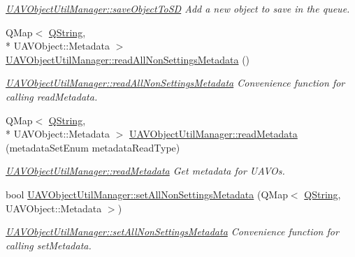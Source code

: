 \begin{DoxyCompactItemize}
\begin{DoxyCompactList}\small\item\em \hyperlink{group___u_a_v_object_util_plugin_ga007cecfcbf4a9d18c1f2c9ec13de4222}{U\-A\-V\-Object\-Util\-Manager\-::save\-Object\-To\-S\-D} Add a new object to save in the queue. \end{DoxyCompactList}\item 
Q\-Map$<$ \hyperlink{group___u_a_v_objects_plugin_gab9d252f49c333c94a72f97ce3105a32d}{Q\-String}, \\*
U\-A\-V\-Object\-::\-Metadata $>$ \hyperlink{group___u_a_v_object_util_plugin_ga1bc82b9cb256ba0c3974bab7489aba4a}{U\-A\-V\-Object\-Util\-Manager\-::read\-All\-Non\-Settings\-Metadata} ()
\begin{DoxyCompactList}\small\item\em \hyperlink{group___u_a_v_object_util_plugin_ga1bc82b9cb256ba0c3974bab7489aba4a}{U\-A\-V\-Object\-Util\-Manager\-::read\-All\-Non\-Settings\-Metadata} Convenience function for calling read\-Metadata. \end{DoxyCompactList}\item 
Q\-Map$<$ \hyperlink{group___u_a_v_objects_plugin_gab9d252f49c333c94a72f97ce3105a32d}{Q\-String}, \\*
U\-A\-V\-Object\-::\-Metadata $>$ \hyperlink{group___u_a_v_object_util_plugin_gac4fbb0efd0a309169dea095945710ed3}{U\-A\-V\-Object\-Util\-Manager\-::read\-Metadata} (metadata\-Set\-Enum metadata\-Read\-Type)
\begin{DoxyCompactList}\small\item\em \hyperlink{group___u_a_v_object_util_plugin_gac4fbb0efd0a309169dea095945710ed3}{U\-A\-V\-Object\-Util\-Manager\-::read\-Metadata} Get metadata for U\-A\-V\-Os. \end{DoxyCompactList}\item 
bool \hyperlink{group___u_a_v_object_util_plugin_gaaa6258eb268dae068887432d5efcfa6c}{U\-A\-V\-Object\-Util\-Manager\-::set\-All\-Non\-Settings\-Metadata} (Q\-Map$<$ \hyperlink{group___u_a_v_objects_plugin_gab9d252f49c333c94a72f97ce3105a32d}{Q\-String}, U\-A\-V\-Object\-::\-Metadata $>$)
\begin{DoxyCompactList}\small\item\em \hyperlink{group___u_a_v_object_util_plugin_gaaa6258eb268dae068887432d5efcfa6c}{U\-A\-V\-Object\-Util\-Manager\-::set\-All\-Non\-Settings\-Metadata} Convenience function for calling set\-Metadata. \end{DoxyCompactList}\item 

\end{DoxyCompactItemize}
